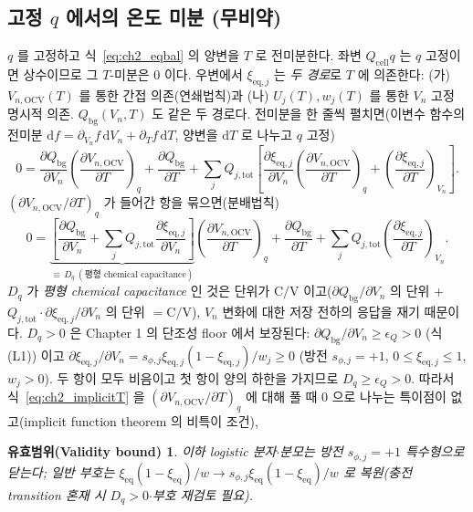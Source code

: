 \documentclass[11pt,a4paper]{article}
\newtheorem*{boundbox}{유효범위(Validity bound)}
\newcommand{\dd}{\mathrm{d}}
\newcommand{\eq}{\mathrm{eq}}
\newcommand{\bg}{\mathrm{bg}}
\newcommand{\cell}{\mathrm{cell}}
\newcommand{\OCV}{\mathrm{OCV}}
\newcommand{\tot}{\mathrm{tot}}
\begin{document}
\subsection{고정 $q$ 에서의 온도 미분 (무비약)}\label{sec:ch2_ocvT_fix}
$q$ 를 고정하고 식~\eqref{eq:ch2_eqbal} 의 양변을 $T$ 로 전미분한다. 좌변 $Q_\cell q$ 는 $q$ 고정이면 상수이므로
그 $T$-미분은 $0$ 이다. 우변에서 $\xi_{\eq,j}$ 는 \emph{두 경로}로 $T$ 에 의존한다: (가) $V_{n,\OCV}(T)$ 를 통한
간접 의존(연쇄법칙)과 (나) $U_j(T),w_j(T)$ 를 통한 $V_n$ 고정 명시적 의존. $Q_\bg(V_n,T)$ 도 같은 두 경로다.
전미분을 한 줄씩 펼치면(이변수 함수의 전미분 $\dd f=\partial_{V_n}f\,\dd V_n+\partial_T f\,\dd T$, 양변을 $\dd T$
로 나누고 $q$ 고정)
\begin{equation}
0=\frac{\partial Q_\bg}{\partial V_n}\left(\frac{\partial V_{n,\OCV}}{\partial T}\right)_q+\frac{\partial Q_\bg}{\partial T}
+\sum_{j}Q_{j,\tot}\!\left[\frac{\partial\xi_{\eq,j}}{\partial V_n}\left(\frac{\partial V_{n,\OCV}}{\partial T}\right)_q
+\left(\frac{\partial\xi_{\eq,j}}{\partial T}\right)_{V_n}\right].
\label{eq:ch2_implicitT_raw}
\end{equation}
$(\partial V_{n,\OCV}/\partial T)_q$ 가 들어간 항을 묶으면(분배법칙)
\begin{equation}
0=\underbrace{\left[\frac{\partial Q_\bg}{\partial V_n}+\sum_{j}Q_{j,\tot}\frac{\partial\xi_{\eq,j}}{\partial V_n}\right]}_{\equiv\,D_q\ (\text{평형 chemical capacitance})}
\left(\frac{\partial V_{n,\OCV}}{\partial T}\right)_q
+\frac{\partial Q_\bg}{\partial T}+\sum_{j}Q_{j,\tot}\left(\frac{\partial\xi_{\eq,j}}{\partial T}\right)_{V_n}.
\label{eq:ch2_implicitT}
\end{equation}
$D_q$ 가 \emph{평형 chemical capacitance} 인 것은 단위가 $\mathrm{C/V}$ 이고($\partial Q_\bg/\partial V_n$ 의
단위 + $Q_{j,\tot}\cdot\partial\xi_{\eq,j}/\partial V_n$ 의 단위 $=\mathrm C/\mathrm V$), $V_n$ 변화에 대한
저장 전하의 응답을 재기 때문이다. $D_q>0$ 은 Chapter 1 의 단조성 floor 에서 보장된다: $\partial Q_\bg/\partial V_n\ge\epsilon_Q>0$
(식 (L1)) 이고 $\partial\xi_{\eq,j}/\partial V_n=s_{\phi,j}\xi_{\eq,j}(1-\xi_{\eq,j})/w_j\ge0$ (방전
$s_{\phi,j}=+1$, $0\le\xi_{\eq,j}\le1$, $w_j>0$). 두 항이 모두 비음이고 첫 항이 양의 하한을 가지므로 $D_q\ge\epsilon_Q>0$.
따라서 식~\eqref{eq:ch2_implicitT} 을 $(\partial V_{n,\OCV}/\partial T)_q$ 에 대해 풀 때 $0$ 으로 나누는 특이점이
없고(implicit function theorem 의 비특이 조건),
\begin{boundbox}
이하 logistic 분자$\cdot$분모는 방전 $s_{\phi,j}=+1$ 특수형으로 닫는다; 일반 부호는
$\xi_{\eq}(1-\xi_{\eq})/w\to s_{\phi,j}\xi_{\eq}(1-\xi_{\eq})/w$ 로 복원(충전 transition 혼재 시 $D_q>0$$\cdot$부호 재검토 필요).
\end{boundbox}
\end{document}
